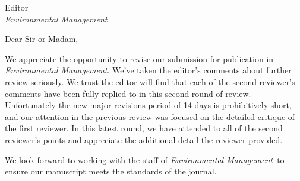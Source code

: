 \documentclass[parskip=half, 
			   fontsize=11pt,
			   paper=a4]				
{scrartcl}
\newcommand{\journal}{\emph{Environmental Management}}
\begin{document}
	\begin{letter}{Editor\\
		\journal }
\setlength{\parindent}{10pt}

\opening{Dear Sir or Madam,}  
		
We appreciate the opportunity to revise our submission for publication in \journal.
We've taken the editor's comments about further review seriously. 
We trust the editor will find that each of the second reviewer's comments have been fully replied to in this second round of review. 
Unfortunately the new major revisions period of 14 days is prohibitively short, and our attention in the previous review was focused on the detailed critique of the first reviewer. 
In this latest round, we have attended to all of the second reviewer's points and appreciate the additional detail the reviewer provided. 

We look forward to working with the staff of \journal~to ensure our manuscript meets the standards of the journal. 

\vspace{-3em} 
\closing{} %
\end{letter}
\end{document}
